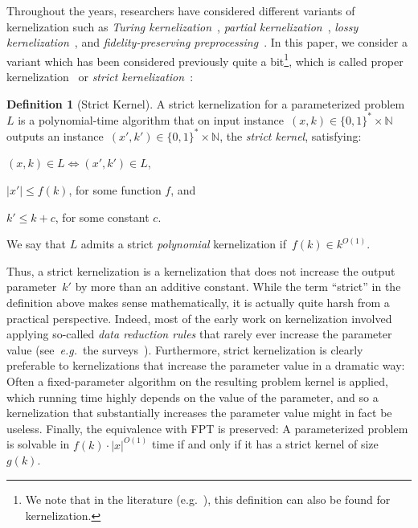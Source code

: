 \documentclass[11pt,a4,USenglish]{article}
\newcommand{\FPT}{\textnormal{FPT}}
\theoremstyle{definition}
\newtheorem{defi}{Definition}
\theoremstyle{plain}
\theoremstyle{remark}
\begin{document}
Throughout the years, researchers have considered different variants of kernelization such as \emph{Turing kernelization}~\cite{BFFLSV12,SKMN12}, \emph{partial kernelization}~\cite{BGKN11}, \emph{lossy kernelization}~\cite{LokshtanovPRS17}, and \emph{fidelity-preserving preprocessing}~\cite{FKRS12}. 
In this paper, we consider a variant which has been considered previously quite a bit\footnote{We note that in the literature (e.g.~\cite{LinFCL17,XiaoK17}), this definition can also be found for kernelization.}, which is called proper kernelization~\cite{AbuKhzamF06} or \emph{strict kernelization}~\cite{chen2011lower}:
\begin{defi}[Strict Kernel]
\label{def:strictPK}
A strict kernelization for a parameterized problem $L$ is a polynomial-time algorithm that on input instance~$(x,k) \in \{0,1\}^* \times \mathbb{N}$ outputs an instance~$(x',k')\in \{0,1\}^* \times \mathbb{N}$, the \emph{strict kernel}, satisfying:
%
%
\begin{inparaenum}[(i)]
\item $(x, k) \in L \iff (x', k') \in L$,
\item $|x'| \le f(k)$, for some function $f$, and
\item $k' \le k + c$, for some constant $c$.
\end{inparaenum}
%
%
We say that $L$ admits a strict \emph{polynomial} kernelization if~$f(k)\in k^{O(1)}$.
%
\end{defi}
\noindent Thus, a strict kernelization is a kernelization that does not increase the output parameter~$k'$ by more than an additive constant.
While the term ``strict'' in the definition above makes sense mathematically, it is actually quite harsh from a practical perspective. Indeed, most of the early work on kernelization involved applying so-called \emph{data reduction rules} that rarely ever increase the parameter value (see~\emph{e.g.}~the surveys~\cite{GN07,Kra14}). %
Furthermore, strict kernelization is clearly preferable to kernelizations that increase the parameter value in a dramatic way: 
%
Often a fixed-parameter algorithm on the resulting problem kernel is applied, which running time highly depends on the value of the parameter, and so a kernelization that substantially increases the parameter value might in fact be useless. 
%
Finally, the equivalence with \FPT{} is preserved: A parameterized problem is solvable in $f(k) \cdot |x|^{O(1)}$ time if and only if it has a strict kernel of size $g(k)$.
\end{document}
